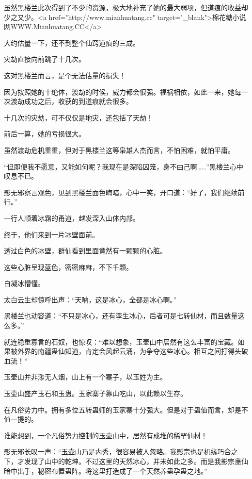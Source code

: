 
\begin{this_body}

虽然黑楼兰此次得到了不少的资源，极大地补充了她的最大弱项，但道痕的收益却少之又少。<a href="http://www.mianhuatang.cc" target="\_blank">棉花糖小说网WWW.Mianhuatang.CC</a>

大约估量一下，还不到整个仙窍道痕的三成。

灾劫直接向前跳了十几次。

这对黑楼兰而言，是个无法估量的损失！

因为按照她的十绝体，渡劫的时候，威力都会很强。福祸相依，如此一来，她每一次渡劫成功之后，收获的到道痕就会很多。

十几次的灾劫，可不仅仅是地灾，还包括了天劫！

前后一算，她的亏损很大。

虽然渡劫危机重重，但对于黑楼兰这等枭雄人杰而言，不怕困难，就怕平庸。

“但即便我不愿意，又能如何呢？我现在是深陷囚笼，身不由己啊……”黑楼兰心中叹息不已。

影无邪察言观色，见到黑楼兰面色晦暗，心中一笑，开口道：“好了，我们继续前行。”

一行人顺着冰霜的甬道，越发深入山体内部。

终于，他们来到一片冰壁面前。

透过白色的冰壁，群仙看到里面竟然有一颗颗的心脏。

这些心脏呈现蓝色，密密麻麻，不下千颗。

白凝冰懵懂。

太白云生却惊呼出声：“天呐，这是冰心，全都是冰心啊。”

黑楼兰也动容道：“不只是冰心，还有孪生冰心，后者可是七转仙材，而且数量这么多。”

就连稳重寡言的石奴，也惊叹：“难以想象，玉壶山中居然有这么丰富的宝藏。如果被外界的南疆蛊仙知道，肯定会风起云涌，为争夺这些冰心。相互之间打得头破血流！”

玉壶山并非渺无人烟，山上有一个寨子，以玉姓为主。

玉壶山盛产玉石和玉蛊。玉家寨子靠山吃山，以此赖以生存。

在凡俗势力中。拥有多位五转蛊师的玉家寨十分强大。但是对于蛊仙而言，却是不值一提的。

谁能想到，一个凡俗势力控制的玉壶山中，居然有成堆的稀罕仙材！

影无邪长叹一声：“玉壶山乃是内秀，很容易被人忽略。我影宗也是机缘巧合之下，才发现了山中的乾坤。不过这里的天然冰心，并未如此之多。而是我影宗蛊仙暗中出手，秘密布置蛊阵。将这里打造成了一个天然养蛊孕蛊之地。”


\end{this_body}
